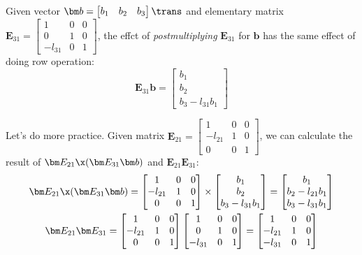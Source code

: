 \begin{example}
Given vector $\bm b=\begin{bmatrix}
b_1&b_2&b_3
\end{bmatrix}\trans$ and elementary matrix $\bm E_{31}=\begin{bmatrix}
1&0&0\\0&1&0\\-l_{31}&0&1
\end{bmatrix}$, the effct of \textit{postmultiplying} $\bm E_{31}$ for $\bm b$ has the same effect of doing row operation:
\[
\bm E_{31}\bm b=\begin{bmatrix}
b_1\\b_2\\b_3-l_{31}b_1
\end{bmatrix}
\]

Let’s do more practice. Given matrix $\bm E_{21}=\begin{bmatrix}
1&0&0\\-l_{21}&1&0\\0&0&1
\end{bmatrix}$, we can calculate the result of $\bm E_{21}\x(\bm E_{31}\bm b)$ and $\bm E_{21}\bm E_{31}$:
\begin{gather*}
\bm E_{21}\x(\bm E_{31}\bm b)=\begin{bmatrix}
1&0&0\\-l_{21}&1&0\\0&0&1
\end{bmatrix}\times\begin{bmatrix}
b_1\\b_2\\b_3-l_{31}b_1
\end{bmatrix}=\begin{bmatrix}
b_1\\b_2-l_{21}b_1\\b_3-l_{31}b_1
\end{bmatrix}\\
\bm E_{21}\bm E_{31}=\begin{bmatrix}
1&0&0\\-l_{21}&1&0\\0&0&1
\end{bmatrix}\begin{bmatrix}
1&0&0\\0&1&0\\-l_{31}&0&1
\end{bmatrix}
=\begin{bmatrix}
1&0&0\\-l_{21}&1&0\\-l_{31}&0&1

\end{bmatrix}
\end{gather*}
\end{example}
